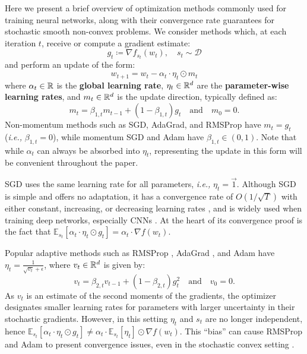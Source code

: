 \documentclass{article}
\newcommand{\ie}{\textit{i.e.,} }
\newcommand{\currw}{w_t}
\newcommand{\nextw}{w_{t+1}}
\newcommand{\fst}{f_{s_t}}
\newcommand{\currg}{g_t}
\newcommand{\prevm}{m_{t-1}}
\newcommand{\currm}{m_t}
\newcommand{\prevv}{v_{t-1}}
\newcommand{\currv}{v_t}
\newcommand{\curre}{\eta_t}
\newcommand{\curra}{\alpha_t}
\newcommand{\btwot}{\beta_{2,t}}
\newcommand{\bonet}{\beta_{1,t}}
\newcommand{\expec}[2]{\mathbb E_{#1} \left[ {#2} \right]}
\newcommand{\dist}{\mathcal D}
\begin{document}
Here we present a brief overview of optimization methods commonly used for
training neural networks, along with their convergence rate guarantees for
stochastic smooth non-convex problems.  We consider methods which, at each
iteration $t$, receive or compute a gradient estimate:
\begin{equation}
   \currg \coloneqq \nabla \fst(\currw), \quad s_t \sim \dist
\end{equation}
and perform an update of the form:
\begin{equation}
    \nextw = \currw - \curra \cdot \curre \odot \currm
\end{equation}
where $\curra \in \R$ is the \textbf{global learning rate},
$\curre \in \R^d$ are the \textbf{parameter-wise learning rates}, and
$\currm \in \R^d$ is the update direction, typically defined as:
\begin{equation}
   \currm = \bonet \prevm + (1 - \bonet) \currg
   \quad \textrm{and} \quad m_0 = 0.
\end{equation}
Non-momentum methods such as SGD, AdaGrad, and RMSProp \citep{rmsprop, adagrad}
have $\currm = \currg$ (\ie $\bonet = 0$), while momentum SGD and Adam
\citep{adam} have $\bonet \in (0,1)$.  Note that while $\curra$ can always be
absorbed into $\curre$, representing the update in this form will be convenient
throughout the paper.

SGD uses the same learning rate for all parameters, \ie $\curre = \vec 1$.
Although SGD is simple and offers no adaptation, it has a convergence rate of
$O(1 / \sqrt T)$ with either constant, increasing, or decreasing learning rates
\citep{nonconvex}, and is widely used when training deep networks, especially
CNNs \citep{resnet1, densenet}.  At the heart of its convergence proof is the
fact that
   $\expec{s_t}{\curra \cdot \curre \odot \currg} =
      \curra \cdot \nabla f(\currw)$.

Popular adaptive methods such as RMSProp \citep{rmsprop}, AdaGrad
\citep{adagrad}, and Adam \citep{adam} have
   $\curre = \frac1{\sqrt{\currv} + \epsilon}$,
where $\currv \in \R^d$ is given by:
\begin{equation}
   \currv = \btwot \prevv + (1-\btwot) \currg^2
   \quad \textrm{and} \quad v_0 = 0.
\end{equation}
As $\currv$ is an estimate of the second moments of the gradients, the
optimizer designates smaller learning rates for parameters with larger
uncertainty in their stochastic gradients.  However, in this setting $\curre$
and $s_t$ are no longer independent, hence
   $\expec{s_t}{\curra \cdot \curre \odot \currg} \neq
      \curra \cdot \expec{s_t}{\curre} \odot \nabla f(\currw)$.
This ``bias'' can cause RMSProp and Adam to present convergence issues, even in
the stochastic convex setting \citep{amsgrad}.
\end{document}
